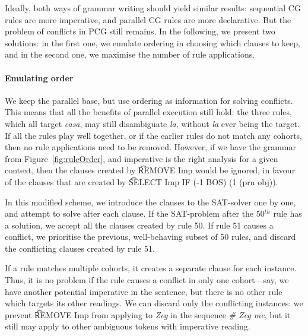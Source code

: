 Ideally, both ways of grammar writing should yield similar results:
sequential CG rules are more imperative, and parallel CG rules are more declarative.
But the problem of conflicts in PCG still remains. 
In the following, we present two solutions: 
in the first one, we emulate ordering in choosing which clauses to keep, and in the second one, we maximise the number of rule applications. 



\paragraph{Emulating order} 

We keep the parallel base, but use ordering as information for solving conflicts.
This means that all the benefits of parallel execution still hold: the three rules, which all target \emph{casa}, may still disambiguate \emph{la}, without \emph{la} ever being the target.
If all the rules play well together, or if the earlier rules do not match any cohorts, 
then no rule applications need to be removed. 
However, if we have the grammar from Figure~\ref{fig:ruleOrder}, 
and imperative is the right analysis for a given context, then the clauses created by 
\t{REMOVE Imp} would be ignored, in favour of the clauses that are created 
by \t{SELECT Imp IF (-1 BOS) (1 (prn obj))}.




In this modified scheme, we introduce the clauses to the SAT-solver one by one, 
and attempt to solve after each clause. If the SAT-problem after the 50$^{th}$ rule 
has a solution, we accept all the clauses created by rule 50. %
If rule 51 causes a conflict, we prioritise the previous, well-behaving subset of
50 rules, and discard the conflicting clauses created by rule 51.

If a rule matches multiple cohorts, it creates a separate clause for each instance.
Thus, it is no problem if the rule causes a conflict in only one cohort---say, we 
have another potential imperative in the sentence, 
but there is no other rule which targets its other readings. 
We can discard only the conflicting instances: we prevent 
\t{REMOVE Imp} from applying to \emph{Zeg} in the sequence \emph{\# Zeg me}, 
but it still may apply to other ambiguous tokens with imperative reading.



